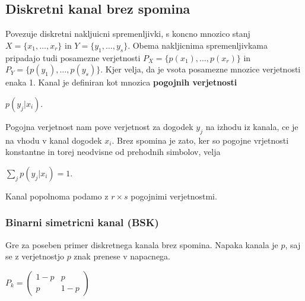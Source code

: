 \documentclass{article}
\begin{document}
\begin{multicols}{4}
\subsection{Diskretni kanal brez spomina}
Povezuje diskretni nakljuicni spremenljivki, s koncno mnozico stanj $X=\{x_1, \dots, x_r\}$ in $Y=\{y_1, \dots, y_s\}$.
Obema nakljicnima spremenljivkama pripadajo tudi posamezne verjetnosti $P_X = \{p(x_1), \dots, p(x_r)\}$ in $P_Y = \{p(y_1), \dots, p(y_s)\}$. Kjer velja, da je vsota posamezne mnozice verjetnosti enaka 1. Kanal je definiran kot mnozica \textbf{pogojnih verjetnosti}
\begin{center}
    $p(y_j | x_i)$.
\end{center}
Pogojna verjetnost nam pove verjetnost za dogodek $y_j$ na izhodu iz kanala, ce je na vhodu v kanal dogodek $x_i$.
Brez spomina je zato, ker so pogojne vrjetnosti konstantne in torej neodvisne od prehodnih simbolov, velja
\begin{center}
    \begin{math}
        \sum_j p(y_j | x_i) = 1.
    \end{math} 
\end{center}
Kanal popolnoma podamo z $r \times s$ pogojnimi verjetnostmi.

\subsubsection{Binarni simetricni kanal (BSK)}
Gre za poseben primer diskretnega kanala brez spomina. Napaka kanala je $p$, saj se z verjetnostjo $p$ znak prenese
v napacnega.
\begin{center}
    \begin{math}
        P_k = 
                \begin{pmatrix}
                    1-p & p\\
                    p & 1-p 
                \end{pmatrix}
    \end{math}
\end{center}


\end{multicols}
\end{document}
